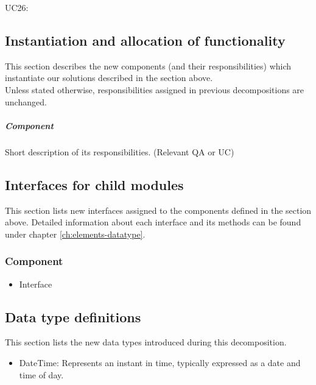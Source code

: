         UC26:

        
\subsection{Instantiation and allocation of functionality}
    This section describes the new components (and their responsibilities)
    which instantiate our solutions described in the section above. \\
    Unless stated otherwise, responsibilities assigned in previous decompositions are unchanged.

    \subparagraph{Component}
        Short description of its responsibilities. (Relevant QA or UC)


\subsection{Interfaces for child modules}
    This section lists new interfaces assigned to the components defined
    in the section above. Detailed information about each interface and
    its methods can be found under chapter \ref{ch:elements-datatype}. \\

    \subsubsection{Component}
        \begin{itemize}
            \item Interface
        \end{itemize}

\subsection{Data type definitions}
    This section lists the new data types introduced during this decomposition.

    \begin{itemize}
        \item DateTime: Represents an instant in time, typically expressed as a date and time of day.
    \end{itemize}
